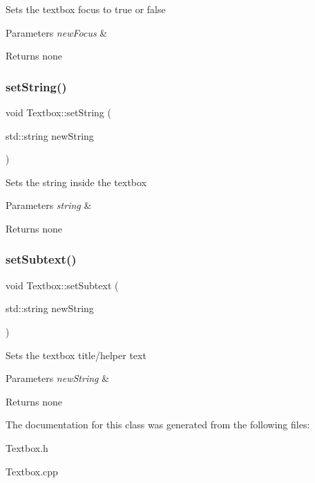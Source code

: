 Sets the textbox focus to true or false


\begin{DoxyParams}{Parameters}
{\em new\+Focus} & \\
\hline
\end{DoxyParams}
\begin{DoxyReturn}{Returns}
none 
\end{DoxyReturn}
\mbox{\label{classTextbox_a2a455fbd16c3070c2711fca4fd36c69b}} 
\subsubsection{\texorpdfstring{set\+String()}{setString()}}
{\footnotesize\ttfamily void Textbox\+::set\+String (\begin{DoxyParamCaption}\item[{std\+::string}]{new\+String }\end{DoxyParamCaption})}

Sets the string inside the textbox


\begin{DoxyParams}{Parameters}
{\em string} & \\
\hline
\end{DoxyParams}
\begin{DoxyReturn}{Returns}
none 
\end{DoxyReturn}
\mbox{\label{classTextbox_a335daf1a9ee0ba2e8c386b9127a723de}} 
\subsubsection{\texorpdfstring{set\+Subtext()}{setSubtext()}}
{\footnotesize\ttfamily void Textbox\+::set\+Subtext (\begin{DoxyParamCaption}\item[{std\+::string}]{new\+String }\end{DoxyParamCaption})}

Sets the textbox title/helper text


\begin{DoxyParams}{Parameters}
{\em new\+String} & \\
\hline
\end{DoxyParams}
\begin{DoxyReturn}{Returns}
none 
\end{DoxyReturn}


The documentation for this class was generated from the following files\+:\begin{DoxyCompactItemize}
\item 
Textbox.\+h\item 
Textbox.\+cpp\end{DoxyCompactItemize}
